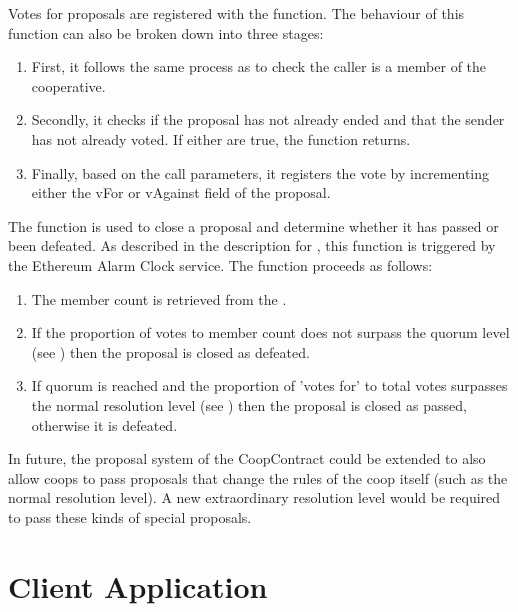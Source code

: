 Votes for proposals are registered with the  function. The behaviour of this function can also be broken down into three stages:
\begin{enumerate}
\item First, it follows the same process as  to check the caller is a member of the cooperative.
\item Secondly, it checks if the proposal has not already ended and that the sender has not already voted. If either are true, the function returns.
\item Finally, based on the call parameters, it registers the vote by incrementing either the vFor or vAgainst field of the proposal.\\
\end{enumerate}

The  function is used to close a proposal and determine whether it has passed or been defeated. As described in the description for , this function is triggered by the Ethereum Alarm Clock service. The function proceeds as follows:
\begin{enumerate}
\item The member count is retrieved from the . 
\item If the proportion of votes to member count does not surpass the quorum level (see ) then the proposal is closed as defeated. 
\item If quorum is reached and the proportion of 'votes for' to total votes surpasses the normal resolution level (see ) then the proposal is closed as passed, otherwise it is defeated.
\end{enumerate}

In future, the proposal system of the CoopContract could be extended to also allow coops to pass proposals that change the rules of the coop itself (such as the normal resolution level). A new extraordinary resolution level would be required to pass these kinds of special proposals.\\

\section{Client Application}
